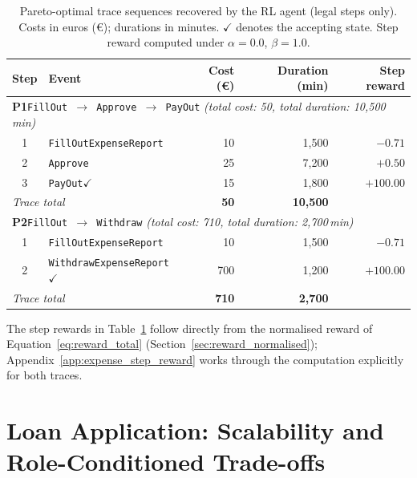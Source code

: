 \begin{table}[H]
\centering
\caption{Pareto-optimal trace sequences recovered by the \ac{RL} agent
         (legal steps only).
         Costs in euros (€); durations in minutes.
         $\checkmark$ denotes the accepting state.
         Step reward computed under $\alpha=0.0$, $\beta=1.0$.}
\label{tab:pareto_traces}
{\renewcommand{\arraystretch}{1.5}
\setlength{\tabcolsep}{6pt}
\begin{tabular}{c l r r r}
\toprule
\textbf{Step} & \textbf{Event} & \textbf{Cost (€)} &
\textbf{Duration (min)} & \textbf{Step reward} \\
\midrule
\multicolumn{5}{l}{\textbf{P1}\enspace \texttt{FillOut $\to$ Approve $\to$ PayOut}
  \quad\textit{(total cost: 50, total duration: 10{,}500\,min)}} \\
\midrule
1 & \texttt{FillOutExpenseReport} & 10  & 1{,}500 & $-0.71$ \\
2 & \texttt{Approve}              & 25  & 7{,}200 & $+0.50$ \\
3 & \texttt{PayOut}\;$\checkmark$ & 15  & 1{,}800 & $+100.00$ \\
\midrule
\multicolumn{2}{l}{\textit{Trace total}} &
  \textbf{50} & \textbf{10{,}500} & \\
\midrule
\multicolumn{5}{l}{\textbf{P2}\enspace \texttt{FillOut $\to$ Withdraw}
  \quad\textit{(total cost: 710, total duration: 2{,}700\,min)}} \\
\midrule
1 & \texttt{FillOutExpenseReport}                & 10  & 1{,}500 & $-0.71$ \\
2 & \texttt{WithdrawExpenseReport}\;$\checkmark$ & 700 & 1{,}200 & $+100.00$ \\
\midrule
\multicolumn{2}{l}{\textit{Trace total}} &
  \textbf{710} & \textbf{2{,}700} & \\
\bottomrule
\end{tabular}}
\end{table}

The step rewards in Table~\ref{tab:pareto_traces} follow directly from
the normalised reward of Equation~\ref{eq:reward_total}
(Section~\ref{sec:reward_normalised}); Appendix~\ref{app:expense_step_reward}
works through the computation explicitly for both traces.


\section{Loan Application: Scalability and Role-Conditioned Trade-offs}
\label{sec:results_loanapp}

